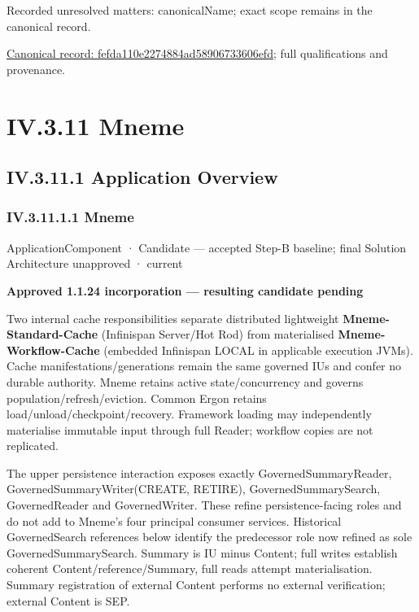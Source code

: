 {\small Recorded unresolved matters: canonicalName; exact scope remains in the canonical record.}\par
{\footnotesize \href{../../../../../../../continuum/application/application-component/fefda110e2274884ad58906733606efd.md}{Canonical record: fefda110e2274884ad58906733606efd}; full qualifications and provenance.}\par
\section*{IV.3.11 Mneme}
\label{navigation:IV.3.11}

\subsection*{IV.3.11.1 Application Overview}
\label{navigation:IV.3.11.1}

\subsubsection*{IV.3.11.1.1 Mneme}
\label{navigation:IV.3.11.1.1}

\label{element:1af8a56358f7429fabfb57be66542a99}
{\small ApplicationComponent · Candidate — accepted Step-B baseline; final Solution Architecture unapproved · current}\par

\par\medskip\textbf{Approved 1.1.24 incorporation — resulting candidate pending}\par


Two internal cache responsibilities separate distributed lightweight \textbf{Mneme-Standard-Cache} (Infinispan Server/Hot Rod) from materialised \textbf{Mneme-Workflow-Cache} (embedded Infinispan LOCAL in applicable execution JVMs). Cache manifestations/generations remain the same governed IUs and confer no durable authority. Mneme retains active state/concurrency and governs population/refresh/eviction. Common Ergon retains load/unload/checkpoint/recovery. Framework loading may independently materialise immutable input through full Reader; workflow copies are not replicated.



The upper persistence interaction exposes exactly GovernedSummaryReader, GovernedSummaryWriter(CREATE, RETIRE), GovernedSummarySearch, GovernedReader and GovernedWriter. These refine persistence-facing roles and do not add to Mneme's four principal consumer services. Historical GovernedSearch references below identify the predecessor role now refined as sole GovernedSummarySearch. Summary is IU minus Content; full writes establish coherent Content/reference/Summary, full reads attempt materialisation. Summary registration of external Content performs no external verification; external Content is SEP.



